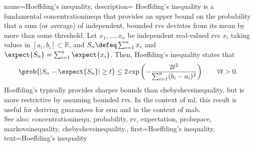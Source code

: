 {name={Hoeffding's inequality},
     description={ Hoeffding's inequality \cite{hoeffding1963probability} is a fundamental \gls{concentrationinequ} that provides an upper bound on the \gls{probability} that a sum (or average) of independent, bounded \glspl{rv}  deviates from its \gls{mean} by more than some threshold. 
     Let $x_1,\dots,x_n$ be independent real-valued \glspl{rv} $x_i$ taking values in $[a_i,b_i] \subset \mathbb{R}$, and $S_n \defeq \sum_{i=1}^n x_i$ and $\expect\{S_n\} = \sum_{i=1}^n \expect\{x_i\}$. Then, Hoeffding's inequality \cite[Theorem 2.2.6]{vershynin2018high} states that
        \begin{equation}
                \prob{ |S_n - \expect\{S_n\}| \geq t } 
            \leq 2 \exp \left( -\frac{2 t^2}{\sum_{i=1}^n (b_i - a_i)^2} \right) \qquad \forall t > 0.
            \label{eq:hoeffding_sum}
        \end{equation}
    Hoeffding's typically provides sharper bounds than \gls{chebyshevsinequality}, but is more restrictive by assuming bounded \glspl{rv}.
    In the context of \gls{ml}, this result is useful for deriving guarantees for \gls{erm}  and in the context of \gls{mab}.  \\
    See also: \gls{concentrationinequ}, \gls{probability}, \gls{rv}, \gls{expectation}, \gls{probspace}, \gls{markovsinequality}, \gls{chebyshevsinequality}.},
    first={Hoeffding's inequality},
    text={Hoeffding's inequality}  
}

